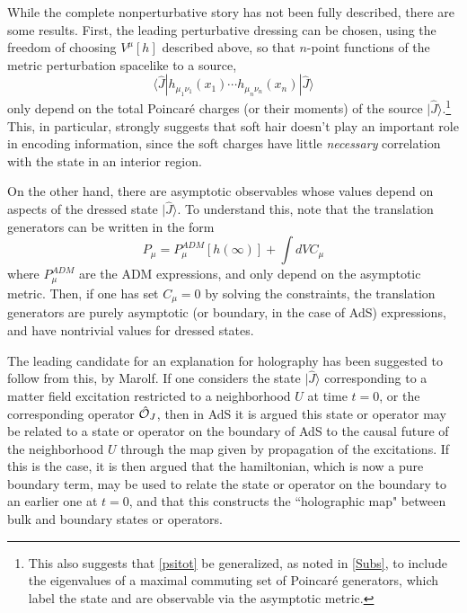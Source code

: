 \documentclass[11pt]{article}
\numberwithin{equation}{section}
\newcommand{\calo}{{\cal O}}
\newcommand{\beq}{\begin{equation}}
\newcommand{\eeq}{\end{equation}}
\begin{document}
While the complete nonperturbative story has not been fully described, there are some results.  First, the leading perturbative dressing can be chosen, using the freedom of choosing $V^\mu[h]$ described above, so that $n$-point functions of the metric perturbation spacelike to a source,
\beq
\langle\widehat J|h_{\mu_1\nu_1}(x_1)\cdots h_{\mu_n\nu_n}(x_n)|\widehat J\rangle
\eeq
only depend on the total Poincar\'e charges (or their moments)\cite{SGsplit} of the source $|\hat J\rangle$.\footnote{This also suggests that \eqref{psitot} be generalized, as noted in \ref{Subs}, to include the eigenvalues of a maximal commuting set of Poincar\'e generators, which label the state and are observable via the asymptotic metric.}  This, in particular, strongly suggests\cite{DoGi3,DoGi4,SGsplit} that soft hair\cite{Hawk-Info,HPS1,HPS2,astrosrev,astrorevisit,HHPS} doesn't play an important role in encoding information, since the soft charges have little {\it necessary} correlation with the state in an interior region.

On the other hand, there are asymptotic observables whose values depend on aspects of the dressed state $|\hat J\rangle$.  To understand this, note that the translation generators can be written in the form
\beq
P_\mu= P_\mu^{ADM}[h(\infty)] + \int dV C_\mu
\eeq
where $P_\mu^{ADM}$ are the ADM expressions, and only depend on the asymptotic metric.  Then, if one has set $C_\mu=0$ by solving the constraints, the translation generators are purely asymptotic (or boundary, in the case of AdS) expressions, and have nontrivial values for dressed states. 

The leading candidate for an explanation for holography has been suggested to follow from this, by Marolf\cite{MaroUH,Marothought, MaroholoNS}.  If one considers the state $|\hat J\rangle$ corresponding to a matter field excitation restricted to a neighborhood $U$ at time $t=0$, or the corresponding operator $\hat\calo_J$, then in AdS it is argued this state or operator may be related to a state or operator on the boundary of AdS to the causal future of the neighborhood $U$ through the map given by propagation of the excitations.  If this is the case, it is then argued that the hamiltonian, which is now a pure boundary term, may be used to relate the state or operator on the boundary to an earlier one at $t=0$, and that this constructs the ``holographic map" between bulk and boundary states or operators.
\end{document}
